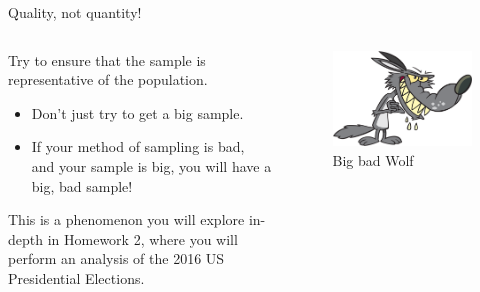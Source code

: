 \documentclass[aspectratio=169]{../latex_main/tntbeamer}  %
\begin{document}
	\begin{frame}{Quality, not quantity!}
	     \begin{columns}
	        \begin{column}{.4\textwidth}
	            Try to ensure that the sample is representative of the population.
                   \begin{itemize}
                       \item Don’t just try to get a big sample.
                       \item If your method of sampling is bad, and your sample is big, you will have a big, bad sample!
                   \end{itemize}
                   \bigskip
                   This is a phenomenon you will explore in-depth in Homework 2, where you will perform an analysis of the 2016 US Presidential Elections.


	        \end{column}
	        \begin{column}{.4\textwidth}
	               \begin{figure}
	                   \centering
	                   \includegraphics[scale=.4]{Bild10}
	                   \caption{Big bad Wolf}
	               \end{figure}
	        \end{column}
	        
	    \end{columns}
	\end{frame}
	
	
	
\end{document}
